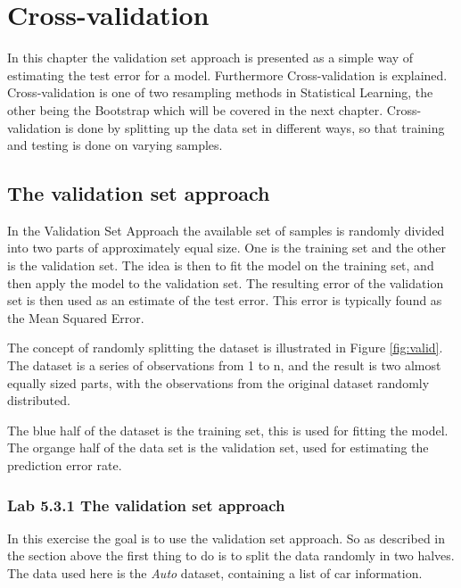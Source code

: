 \chapter{Cross-validation}
In this chapter the validation set approach is presented as a simple way of estimating the test error for a model. Furthermore Cross-validation  is explained. Cross-validation is one of two resampling methods in Statistical Learning, the other being the Bootstrap which will be covered in the next chapter. Cross-validation is done by splitting up the data set in different ways, so that training and testing is done on varying samples. 



\section{The validation set approach}
\label{sec:VSA}
In the Validation Set Approach the available set of samples is randomly divided into two parts of approximately equal size. One is the training set and the other is the validation set. The idea is then to fit the model on the training set, and then apply the model to the validation set. The resulting error of the validation set is then used as an estimate of the test error. This error is typically found as the Mean Squared Error. 


The concept of randomly splitting the dataset is illustrated in Figure \ref{fig:valid}. The dataset is a series of observations from 1 to n, and the result is two almost equally sized parts, with the observations from the original dataset randomly distributed. 

The blue half of the dataset is the training set, this is used for fitting the model. The organge half of the data set is the validation set, used for estimating the prediction error rate.


\subsection{Lab 5.3.1 The validation set approach}
In this exercise the goal is to use the validation set approach. So as described in the section above the first thing to do is to split the data randomly in two halves. The data used here is the \emph{Auto} dataset, containing a list of car information. 

